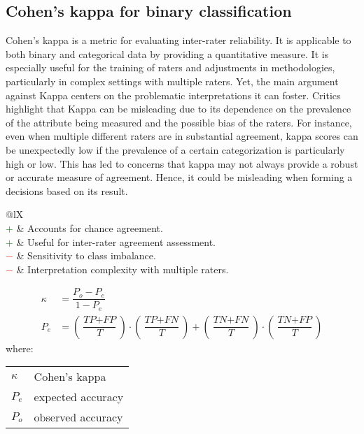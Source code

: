 \documentclass{article}
\makeatletter
\newenvironment{conditions}[1][where:]
	{\hspace{0.02\textwidth} #1 \begin{tabular}[t]{>{$}l<{$} @{${}={}$} l}}
	{\end{tabular}\\[\belowdisplayskip]}
\makeatother
\begin{document}
\subsection[Cohen's kappa for binary classification]{Cohen's kappa for binary classification \cite{cohen1960coefficient, ranganathan2017common, chicco2021matthews}}

Cohen's kappa is a metric for evaluating inter-rater reliability. It is applicable to both binary and categorical data by providing a quantitative measure. It is especially useful for the training of raters and adjustments in methodologies, particularly in complex settings with multiple raters. Yet, the main argument against Kappa centers on the problematic interpretations it can foster. Critics highlight that Kappa can be misleading due to its dependence on the prevalence of the attribute being measured and the possible bias of the raters. For instance, even when multiple different raters are in substantial agreement, kappa scores can be unexpectedly low if the prevalence of a certain categorization is particularly high or low. This has led to concerns that kappa may not always provide a robust or accurate measure of agreement. Hence, it could be misleading when forming a decisions based on its result. \cite{pontius2011death, olofsson2014good, foody2020explaining}

\begin{table}[H]\centering
	\begin{tabularx}{\textwidth}{@{}lX}
		 \\
		\textcolor{Green}{$+$} & Accounts for chance agreement. \\
		\textcolor{Green}{$+$} & Useful for inter-rater agreement assessment. \\
		\textcolor{Red}{$-$}   & Sensitivity to class imbalance. \\
		\textcolor{Red}{$-$}   & Interpretation complexity with multiple raters.
	\end{tabularx}
\end{table}

\begin{equation}
	\begin{aligned}
		\kappa &= \dfrac{P_o - P_e}{1 - P_e} \\
		P_e    &= \left(\dfrac{\textit{TP} + \textit{FP}}{T}\right) \cdot \left(\dfrac{\textit{TP} + \textit{FN}}{T}\right) + \left(\dfrac{\textit{TN} + \textit{FN}}{T}\right) \cdot \left(\dfrac{\textit{TN} + \textit{FP}}{T}\right)
%
		\label{equation:k}
	\end{aligned}
\end{equation}
%
\begin{conditions}
	\kappa & Cohen's kappa \\
	P_e    & expected accuracy \\
	P_o    & observed accuracy
\end{conditions}
\end{document}
